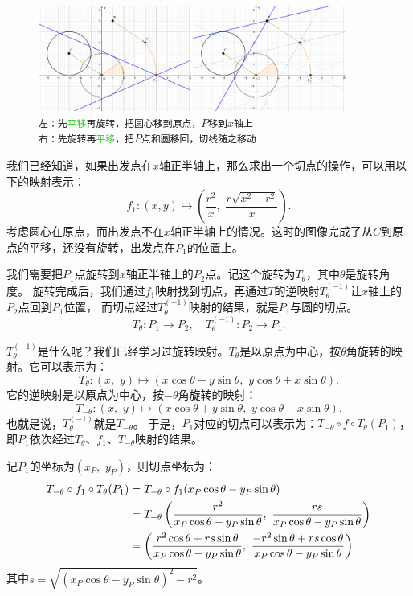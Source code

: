\documentclass[12pt,UTF8]{ctexbook}
\begin{document}
\begin{figure}[h]
    \vspace{4pt}
    \centering
    \includegraphics[width=0.9\textwidth]{求切线变换1.png}
    \captionsetup{justification=centering}
    \caption*{\texttt{左：先\textcolor{LimeGreen}{平移}再\textcolor{YellowOrange}{旋转}，把圆心移到原点，$P$移到$x$轴上\\ 
                      右：先\textcolor{YellowOrange}{旋转}再\textcolor{LimeGreen}{平移}，把$P$点和圆移回，切线随之移动}}
\end{figure}

我们已经知道，如果出发点在$x$轴正半轴上，那么求出一个切点的操作，可以用以下的映射表示：
$$f_1: (x, y) \mapsto \left(\frac{r^2}{x},\,\, \frac{r\sqrt{x^2 - r^2}}{x}\right).$$
考虑圆心在原点，而出发点不在$x$轴正半轴上的情况。这时的图像完成了从$C$到原点的平移，还没有旋转，出发点在$P_1$的位置上。

我们需要把$P_1$点旋转到$x$轴正半轴上的$P_2$点。记这个旋转为$T_\theta$，其中$\theta$是旋转角度。
旋转完成后，我们通过$f_1$映射找到切点，再通过$T$的逆映射$T_\theta^{(-1)}$让$x$轴上的$P_2$点回到$P_1$位置，
而切点经过$T_\theta^{(-1)}$映射的结果，就是$P_1$与圆的切点。
$$T_\theta: P_1 \longrightarrow P_2, \quad T_\theta^{(-1)}: P_2 \longrightarrow P_1.$$

$T_\theta^{(-1)}$是什么呢？我们已经学习过旋转映射。$T_\theta$是以原点为中心，按$\theta$角旋转的映射。它可以表示为：
$$T_\theta: (x,\,\, y) \mapsto (x\cos{\theta} - y\sin{\theta},\,\,y\cos{\theta} + x\sin{\theta}).$$
它的逆映射是以原点为中心，按$-\theta$角旋转的映射：
$$T_{-\theta}: (x,\,\, y) \mapsto (x\cos{\theta} + y\sin{\theta},\,\,y\cos{\theta} - x\sin{\theta}).$$
也就是说，$T_\theta^{(-1)}$就是$T_{-\theta}$。
于是，$P_1$对应的切点可以表示为：$T_{-\theta}\circ f\circ T_\theta(P_1)$，即$P_1$依次经过$T_\theta$、$f_1$、$T_{-\theta}$映射的结果。

记$P_1$的坐标为$(x_P,\,\,y_P)$，则切点坐标为：
\begin{align}
    T_{-\theta}\circ f_1\circ T_\theta(P_1) &= T_{-\theta}\circ f_1(x_P\cos{\theta} - y_P\sin{\theta}) \notag \\
    &= T_{-\theta}\left(\frac{r^2}{x_P\cos{\theta} - y_P\sin{\theta}},\,\, \frac{rs}{x_P\cos{\theta} - y_P\sin{\theta}}\right) \notag \\
    &= \left(\frac{r^2\cos{\theta} + rs\sin{\theta}}{x_P\cos{\theta} - y_P\sin{\theta}},\,\, \frac{-r^2\sin{\theta} + rs\cos{\theta}}{x_P\cos{\theta} - y_P\sin{\theta}}\right) \notag
\end{align}
其中$s = \sqrt{(x_P\cos{\theta} - y_P\sin{\theta})^2 - r^2}$。
\end{document}
